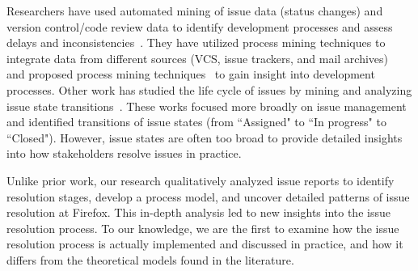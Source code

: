 Researchers have used automated mining of issue data (\eg status changes) and version control/code review data to identify development processes and assess delays and inconsistencies~\cite{marques2018assessing,krismayer2019using}. 
They have utilized process mining techniques to integrate data from different sources (\eg VCS, issue trackers, and mail archives)~\cite{poncin2011process, gupta2014process,mittal2014process} and proposed process mining techniques~\cite{rubin2007process,gupta2014nirikshan,saini2020control} to gain insight into development processes. Other work has studied the life cycle of issues by mining and analyzing issue state transitions~\cite{eren2023analyzing,dobrzynski2016tracing,wang2012predicting,coremans2023process}.
These works focused more broadly on issue management and identified transitions of issue states (\eg from ``Assigned" to ``In progress" to ``Closed"). 
However, issue states are often too broad to provide detailed insights into how stakeholders resolve issues in practice.




Unlike prior work, our research qualitatively analyzed issue reports to identify resolution stages, develop a process model, and uncover detailed patterns of issue resolution at Firefox. This in-depth analysis led to new insights into the issue resolution process. To our knowledge, we are the first to examine how the issue resolution process is actually implemented and discussed in practice, and how it differs from the theoretical models found in the literature.

